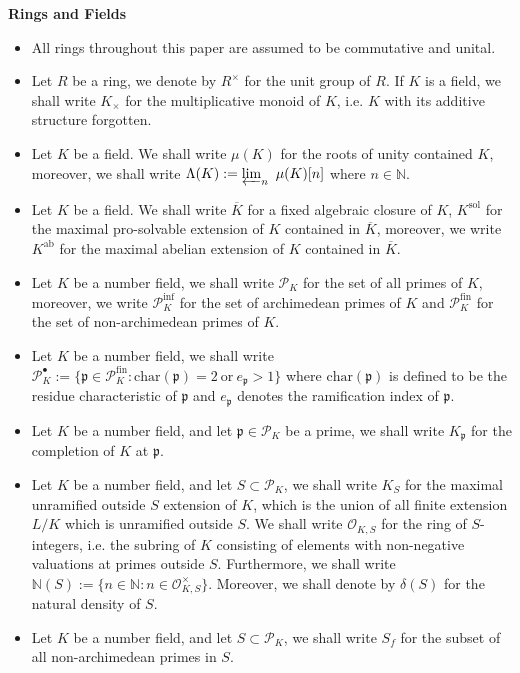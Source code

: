 \documentclass{article}
\theoremstyle{plain}
\theoremstyle{definition}
\theoremstyle{remark}
\begin{document}
\textbf{Rings and Fields}
\begin{itemize}
    \item All rings throughout this paper are assumed to be commutative and unital.
    \item Let $R$ be a ring, we denote by $R^{\times}$ for the unit group of $R$. If $K$ is a field, we shall write $K_{\times}$ for the multiplicative monoid of $K$, i.e. $K$ with its additive structure forgotten.
    \item Let $K$ be a field. We shall write $\mu(K)$ for the roots of unity contained $K$, moreover, we shall write $\Lambda(K) := \varprojlim_n ~\mu(K)[n]$ where $n \in \mathbb N$.
    \item Let $K$ be a field. We shall write $\overline{K}$ for a fixed algebraic closure of $K$, $K^{\text{sol}}$ for the maximal pro-solvable extension of $K$ contained in $\overline K$, moreover, we write $K^{\text{ab}}$ for the maximal abelian extension of $K$ contained in $\overline{K}$.
    \item Let $K$ be a number field, we shall write $\mathscr{P}_K$ for the set of all primes of $K$, moreover, we write $\mathscr{P}_K^{\text{inf}}$ for the set of archimedean primes of $K$ and $\mathscr{P}_{K}^{\text{fin}}$ for the set of non-archimedean primes of $K$. 
    \item Let $K$ be a number field, we shall write $\mathscr{P}_K^{\bullet} := \{\mathfrak{p} \in \mathscr{P}_K^{\text{fin}}: \text{char}(\mathfrak{p}) = 2~\text{or}~e_{\mathfrak{p}}>1\}$ where $\text{char}(\mathfrak{p})$ is defined to be the residue characteristic of $\mathfrak{p}$ and $e_{\mathfrak{p}}$ denotes the ramification index of $\mathfrak{p}$. 
    \item Let $K$ be a number field, and let $\mathfrak{p} \in \mathscr{P}_K$ be a prime, we shall write $K_{\mathfrak{p}}$ for the completion of $K$ at $\mathfrak{p}$.
    \item Let $K$ be a number field, and let $S \subset \mathscr{P}_K$, we shall write $K_S$ for the maximal unramified outside $S$ extension of $K$, which is the union of all finite extension $L/K$ which is unramified outside $S$. We shall write $\mathcal{O}_{K,S}$ for the ring of $S$-integers, i.e. the subring of $K$ consisting of elements with non-negative valuations at primes outside $S$. Furthermore, we shall write $\mathbb N(S) := \{n \in \mathbb N: n \in \mathcal O_{K,S}^{\times}\}$. Moreover, we shall denote by $\delta(S)$ for the natural density of $S$. 
    \item Let $K$ be a number field, and let $S \subset \mathscr{P}_K$, we shall write $S_f$ for the subset of all non-archimedean primes in $S$.

\end{itemize}
\end{document}
